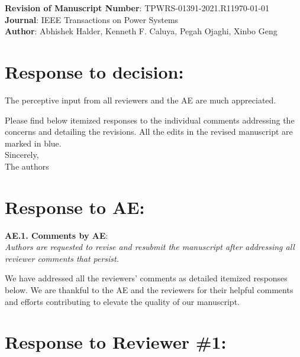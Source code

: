 \documentclass[12pt,onecolumn]{IEEEtran}
\newcommand{\blue}{\color{blue}}
\newcommand{\bp}{{\bm{p}}}
\def\spacingset#1{\def\baselinestretch{#1}\small\normalsize}
\newcommand{\nib}{\noindent  {\bf Response:} }
\begin{document}
\noindent
{\large {\bf Revision of
Manuscript Number}: TPWRS-01391-2021.R1\hfill \today\\[.1in]
{\bf Journal}: IEEE Transactions on Power Systems \\[.1in]
{\bf Author}: Abhishek Halder, Kenneth F. Caluya, Pegah Ojaghi, Xinbo Geng}\\



\section*{\large \bf Response to decision:}

{\noindent\blue
The perceptive input from all reviewers and the AE are much appreciated. 

Please find below itemized responses to the individual comments addressing the concerns and detailing the revisions. All the edits in the revised manuscript are marked in blue.\\

\noindent
Sincerely,\\
The authors
}



\spacingset{1}

\section*{\large \bf Response to AE:}

\noindent
{\bf AE.1. Comments by AE}:\\
{\em Authors are requested to revise and resubmit the manuscript after addressing all reviewer comments that persist.
}

{\nib {\blue We have addressed all the reviewers' comments as detailed itemized responses below. We are thankful to the AE and the reviewers for their helpful comments and efforts contributing to elevate the quality of our manuscript.
}}





\spacingset{1}

\section*{\large \bf Response to Reviewer \#1:}
\end{document}
